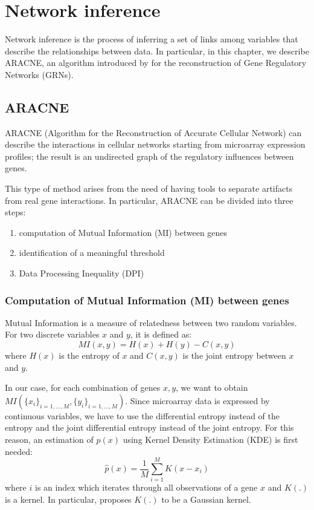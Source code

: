 \chapter{Network inference}

Network inference is the process of inferring a set of links among variables
that describe the relationships between data.
In particular, in this chapter, we describe ARACNE, an algorithm introduced by \cite{DBLP:journals/bmcbi/MargolinNBWSFC06}
for the reconstruction of Gene Regulatory Networks (GRNs).

\section{ARACNE}
ARACNE (Algorithm for the Reconstruction of Accurate Cellular Network)
can describe the interactions in cellular networks
starting from microarray expression profiles;
the result is an undirected graph of the regulatory influences between genes.

This type of method arises from the need of having tools to separate artifacts
from real gene interactions.
In particular, ARACNE can be divided into three steps:
\begin{enumerate}
    \item computation of Mutual Information (MI) between genes
    \item identification of a meaningful threshold
    \item Data Processing Inequality (DPI)
\end{enumerate}

\subsection{Computation of Mutual Information (MI) between genes} \label{MI}
Mutual Information is a measure of relatedness between two random variables.
For two discrete variables $x$ and $y$, it is defined as:
\[ \mathit{MI}(x, y) = H(x) + H(y) - C(x, y) \]
where $H(x)$ is the entropy of $x$ and $C(x, y)$ is the joint entropy between $x$ and $y$.

In our case, for each combination of genes $x, y$,
we want to obtain $\mathit{MI}(\{ x_i \}_{i=1,\dots,M}, \{ y_i \}_{i=1,\dots,M})$.
Since microarray data is expressed by continuous variables,
we have to use the differential entropy instead of the entropy
and the joint differential entropy instead of the joint entropy.
For this reason, an estimation of $p(x)$
using Kernel Density Estimation (KDE) is first needed:
\[ \hat{p}(x) = \frac{1}{M} \sum_{i=1}^{M} K(x - x_i) \]
where $i$ is an index which iterates through all observations of a gene $x$
and $K(.)$ is a kernel.
In particular, \cite{DBLP:journals/bmcbi/MargolinNBWSFC06} proposes
$K(.)$ to be a Gaussian kernel.

